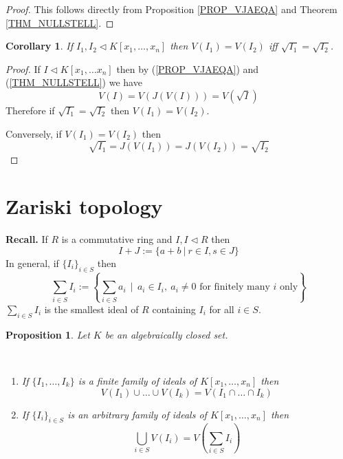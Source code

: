 \documentclass[12pt, letterpaper, oneside]{article}
\theoremstyle{plain}
\newtheorem{proposition}[theorem]{Proposition}
\newtheorem{corollary}[theorem]{Corollary}
\theoremstyle{definition}
\newcommand{\benu}{\begin{enumerate}}
\newcommand{\eenu}{\end{enumerate}}
\newcommand{\vs}{\vskip 5mm}
\begin{document}
\vs

\begin{proof}
This follows directly from Proposition \ref{PROP_VJAEQA} 
and Theorem \ref{THM_NULLSTELL}.
\end{proof}



\vs\vs

\begin{corollary}
\label{COR_IDEALSDAMEALGSETS}
If $I_{1}, I_{2}\lhd K[x_{1}, \dots, x_{n}]$ then $V(I_{1}) = V(I_{2})$ iff 
$\sqrt{I_{1}} = \sqrt{I_{2}}$. 
\end{corollary}


\vs

\begin{proof}
If $I\lhd K[x_{1}, \dots x_{n}]$ then by (\ref{PROP_VJAEQA}) and (\ref{THM_NULLSTELL})
we have 
$$V(I) = V(J(V(I))) = V(\sqrt{I}) $$
Therefore if $\sqrt{I_{1}} = \sqrt{I_{2}}$ then $V(I_{1}) = V(I_{2})$. 

Conversely, if $V(I_{1}) = V(I_{2})$ then 
$$\sqrt{I_{1}} = J(V(I_{1})) = J(V(I_{2})) = \sqrt{I_{2}}$$

\end{proof}




\newpage
\section{Zariski topology}
\label{SEC_ZARISKITOP}


\textbf{Recall.} If $R$ is a commutative ring and $I, I\lhd R$ then 
$$I+J := \{a+b \ | \ r\in I, s\in J\}$$ 
In general, if $\{I_{i}\}_{i\in S}$ then 
$$\sum_{i\in S} I_{i} :=  \left\{ \sum_{i\in S} a_{i} \ \ \bigg| \ \ a_{i}\in I_{i}, \  a_{i}\neq 0
\text{ for finitely many $i$ only} \right\}$$
$\sum_{i\in S} I_{i}$ is the smallest ideal of $R$ containing $I_{i}$ for all $i\in S$. 


\vs\vs


\begin{proposition}
\label{PROP_INTERSUMIDEALSVSALGSETS}
Let $K$ be an algebraically closed set. 

\vskip -13mm 

\ 
\benu
\item If $\{I_{1}, \dots, I_{k}\}$ is a finite family of ideals of $K[x_{1}, \dots, x_{n}]$ then 
$$V(I_{1})\cup \dots \cup V(I_{k}) = V(I_{1}\cap \dots \cap I_{k}) $$
\item If $\{I_{i}\}_{i\in S}$ is an arbitrary family of ideals of $K[x_{1}, \dots, x_{n}]$ then 
$$ \bigcup_{i\in S} V(I_{i}) = V({\textstyle{\sum_{i\in S} I_{i}}})$$
\eenu


\end{proposition}
\end{document}
